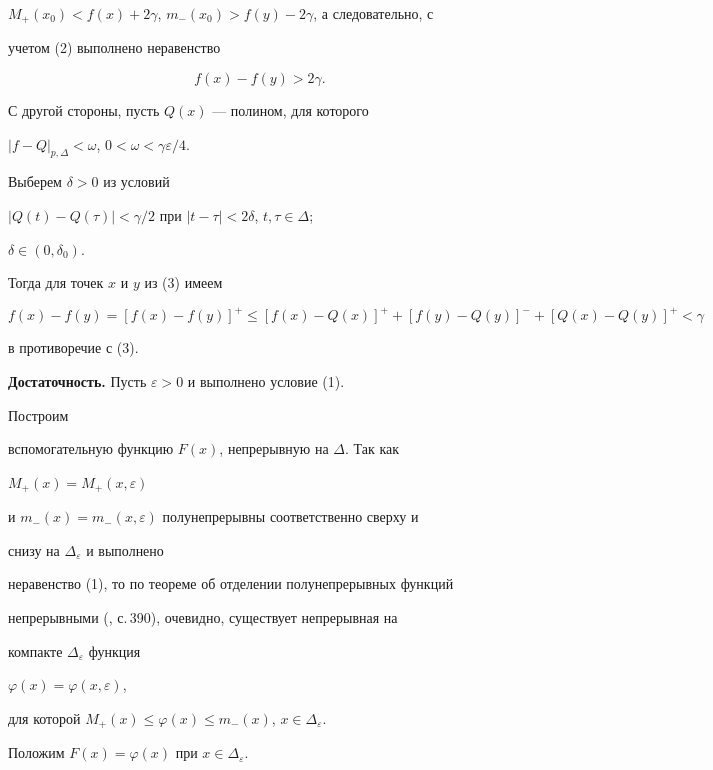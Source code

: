 $M_+(x_0)<f(x)+2\gamma$, $m_-(x_0)>f(y)-2\gamma$, а следовательно, с


учетом (2) выполнено неравенство


\begin{equation}


f(x)-f(y)>2\gamma.


\end{equation}





С другой стороны, пусть $Q(x)$ --- полином, для которого


$|f-Q|_{p,\Delta}<\omega$, $0<\omega<\gamma\varepsilon/4$.


Выберем $\delta>0$ из условий


$|Q(t)-Q(\tau)|<\gamma/2$ при $|t-\tau|<2\delta$, $t,\tau\in\Delta$;


$\delta\in(0,\delta_0)$.


Тогда для точек $x$ и $y$ из (3) имеем


$$


f(x)-f(y)=[f(x)-f(y)]^+\le [f(x)-Q(x)]^+ +


[f(y)-Q(y)]^- +[Q(x)-Q(y)]^+ <\gamma


$$


в противоречие с (3).


\medskip





{\bf Достаточность.} Пусть $\varepsilon>0$ и выполнено условие (1).


Построим


вспомогательную функцию $F(x)$, непрерывную на $\Delta$. Так как


$M_+(x)=M_+(x,\varepsilon)$


и $m_-(x)=m_-(x,\varepsilon)$ полунепрерывны соответственно сверху и


снизу на $\Delta_\varepsilon$ и выполнено


неравенство (1), то по теореме об отделении полунепрерывных функций


непрерывными (\cite{7}, с.\,390), очевидно, существует непрерывная на


компакте $\Delta_\varepsilon$ функция


$\varphi(x)=\varphi(x,\varepsilon)$,


для которой $M_+(x)\le\varphi(x)\le m_-(x)$, $x\in\Delta_\varepsilon$.


Положим $F(x)=\varphi(x)$ при $x\in\Delta_\varepsilon$.





